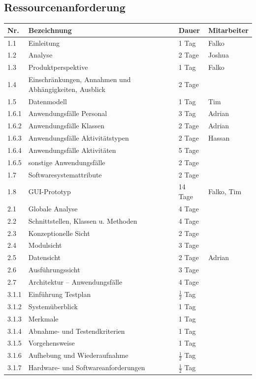 \documentclass[fontsize=12pt,paper=a4,twoside]{scrartcl}
\begin{document}
\subsection{Ressourcenanforderung}

\begin{tabularx}{\textwidth}{|p{1cm}|p{5.5cm}|p{2cm}|X|}
\hline \textbf{Nr.} &\textbf{Bezeichnung} & \textbf{Dauer} & \textbf{Mitarbeiter} \\
\hline 		1.1		& Einleitung							&	1 Tag		& Falko\\
\hline 		1.2 	& Analyse		                		&	2 Tage		& Joshua\\
\hline 		1.3		& Produktperspektive					&	1 Tag		& Falko\\
\hline 		1.4		& Einschränkungen, Annahmen und Abhängigkeiten, Ausblick & 2 Tage &\\
\hline 		1.5 	& Datenmodell	                		&   1 Tag       & Tim\\
\hline 		1.6.1 	& Anwendungsfälle Personal      		&   3 Tag	    & Adrian \\
\hline 		1.6.2 	& Anwendungsfälle Klassen       		&   2 Tage      & Adrian \\
\hline 		1.6.3 	& Anwendungsfälle Aktivitätstypen		&	2 Tage		& Hassan \\
\hline 		1.6.4 	& Anwendungsfälle Aktivitäten			&	5 Tage		&  \\
\hline 		1.6.5	& sonstige Anwendungsfälle      		&	2 Tage		&  \\
\hline 		1.7		& Softwaresystemattribute       		&	2 Tage	    &  \\
\hline 		1.8 	& GUI-Prototyp                  		&	14 Tage		& Falko, Tim \\
\hline		2.1		& Globale Analyse						&	4 Tage		&  \\
\hline 		2.2		& Schnittstellen, Klassen u. Methoden 	& 	4 Tage		&  \\
\hline 		2.3		& Konzeptionelle Sicht					& 	2 Tage		&  \\
\hline		2.4		& Modulsicht							&   3 Tage		&  \\
\hline 		2.5		& Datensicht							& 	2 Tage		& Adrian \\
\hline 		2.6		& Ausführungssicht						& 	3 Tage		&  \\
\hline		2.7		& Architektur -- Anwendungsfälle		&	4 Tage		&	\\
\hline		3.1.1	& Einführung Testplan					& $\frac{1}{2}$ Tag & \\
\hline 		3.1.2	& Systemüberblick						&   1 Tag		&  \\
\hline 		3.1.3	& Merkmale								&	1 Tag		&	\\
\hline 		3.1.4	& Abnahme- und Testendkriterien			&	1 Tag		&	\\
\hline 		3.1.5	& Vorgehensweise						&	1 Tag		&	\\
\hline 		3.1.6	& Aufhebung und Wiederaufnahme			& $\frac{1}{2}$ Tag	&	\\
\hline 		3.1.7	& Hardware- und Softwareanforderungen	&$\frac{1}{2}$ Tag	&	\\
\hline
\end{tabularx}\clearpage
\end{document}
